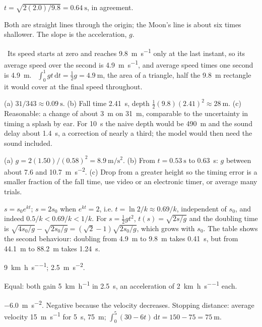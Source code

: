 \documentclass[11pt,twoside,openany]{book}
\newcommand{\dd}{\mathrm{d}}
\newcommand{\viewtag}[3]{\fcolorbox{#2}{#3}{\footnotesize\textbf{\textcolor{#2}{#1}}}}
\newcommand{\elemtag}{\viewtag{Elementary}{elemcol}{elempale}}
\newcommand{\calctag}{\viewtag{Calculus}{calccol}{calcpale}}
\begin{document}
\begin{description}[leftmargin=2.6em,itemsep=3pt,style=sameline]
  \item[2.34] $t = \sqrt{2(2.0)/9.8} = \SI{0.64}{\second}$, in agreement.
  \item[2.35] Both are straight lines through the origin; the Moon's line is about six times shallower. The slope is the acceleration, $g$.
  \item[2.36] \elemtag\ Its speed starts at zero and reaches \SI{9.8}{\metre\per\second} only at the last instant, so its average speed over the second is \SI{4.9}{\metre\per\second}, and average speed times one second is \SI{4.9}{\metre}. \calctag\ $\int_0^1 gt\,\dd t = \tfrac12 g = \SI{4.9}{\metre}$, the area of a triangle, half the \SI{9.8}{\metre} rectangle it would cover at the final speed throughout.
  \item[2.37] (a) $31/343 \approx \SI{0.09}{\second}$. (b) Fall time \SI{2.41}{\second}, depth $\tfrac12 (9.8)(2.41)^2 \approx \SI{28}{\metre}$. (c) Reasonable: a change of about \SI{3}{\metre} on \SI{31}{\metre}, comparable to the uncertainty in timing a splash by ear. For \SI{10}{\second} the naive depth would be \SI{490}{\metre} and the sound delay about \SI{1.4}{\second}, a correction of nearly a third; the model would then need the sound included.
  \item[2.38] (a) $g = 2(1.50)/(0.58)^2 = \SI{8.9}{\metre\per\second\squared}$. (b) From $t = \SI{0.53}{\second}$ to \SI{0.63}{\second}: $g$ between about \SI{7.6}{} and \SI{10.7}{\metre\per\second\squared}. (c) Drop from a greater height so the timing error is a smaller fraction of the fall time, use video or an electronic timer, or average many trials.
  \item[2.39] $s = s_0 e^{kt}$; $s = 2s_0$ when $e^{kt} = 2$, i.e. $t = \ln 2/k \approx 0.69/k$, independent of $s_0$, and indeed $0.5/k < 0.69/k < 1/k$. For $s = \tfrac12 g t^2$, $t(s) = \sqrt{2s/g}$ and the doubling time is $\sqrt{4s_0/g} - \sqrt{2s_0/g} = (\sqrt2 - 1)\sqrt{2s_0/g}$, which grows with $s_0$. The table shows the second behaviour: doubling from \SI{4.9}{\metre} to \SI{9.8}{\metre} takes \SI{0.41}{\second}, but from \SI{44.1}{\metre} to \SI{88.2}{\metre} takes \SI{1.24}{\second}.
  \item[2.40] \SI{9}{\kilo\metre\per\hour\per\second}; \SI{2.5}{\metre\per\second\squared}.
  \item[2.41] Equal: both gain \SI{5}{\kilo\metre\per\hour} in \SI{2.5}{\second}, an acceleration of \SI{2}{\kilo\metre\per\hour\per\second} each.
  \item[2.42] \SI{-6.0}{\metre\per\second\squared}. Negative because the velocity decreases. Stopping distance: average velocity \SI{15}{\metre\per\second} for \SI{5}{\second}, \SI{75}{\metre}; $\int_0^5 (30 - 6t)\,\dd t = 150 - 75 = \SI{75}{\metre}$.

\end{description}
\end{document}
